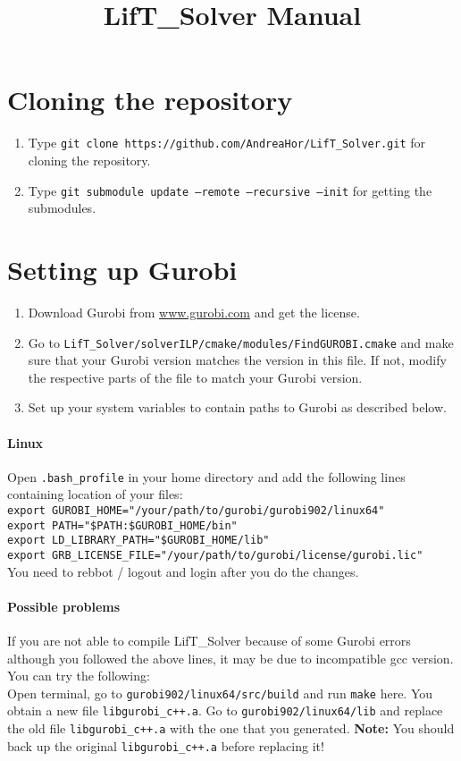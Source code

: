 \documentclass[a4paper,10pt]{article}
\title{LifT\_Solver Manual}
\author{}
\begin{document}
\maketitle



\section{Cloning the repository}
\begin{enumerate}
 \item Type \texttt{git clone https://github.com/AndreaHor/LifT\_Solver.git} for cloning the repository.
 \item Type \texttt{git submodule update --remote --recursive --init} for  getting the submodules.
 \end{enumerate}
\section{Setting up Gurobi}

\begin{enumerate}
 \item Download Gurobi from \url{www.gurobi.com} and get the license. 
 \item Go to \texttt{LifT\_Solver/solverILP/cmake/modules/FindGUROBI.cmake} and make sure that your Gurobi version matches the version in this file. If not, modify the respective parts of the file to match your Gurobi version. 
 \item Set up your system variables to contain paths to Gurobi as described below.
 \end{enumerate}
 \paragraph{Linux}
Open \texttt{.bash\_profile} in your home directory and add the following lines containing location of your files:\\
\texttt{export GUROBI\_HOME="/your/path/to/gurobi/gurobi902/linux64"\\
export PATH="\${PATH}:\${GUROBI\_HOME}/bin"\\
export LD\_LIBRARY\_PATH="\${GUROBI\_HOME}/lib"\\ 
export GRB\_LICENSE\_FILE="/your/path/to/gurobi/license/gurobi.lic" }\\
You need to rebbot / logout and login after you do the changes.
 
\paragraph{Possible problems} If you are not able to compile LifT\_Solver because of some Gurobi errors although you followed the above lines, it may be due to incompatible gcc version. You can try the following:\\
Open terminal, go to \texttt{gurobi902/linux64/src/build} and run \texttt{make} here. You obtain a new file \texttt{libgurobi\_c++.a}. Go to \texttt{gurobi902/linux64/lib} and replace the old file \texttt{libgurobi\_c++.a} with the one that you generated. \textbf{Note:} You should back up the original \texttt{libgurobi\_c++.a} before replacing it!
\end{document}
